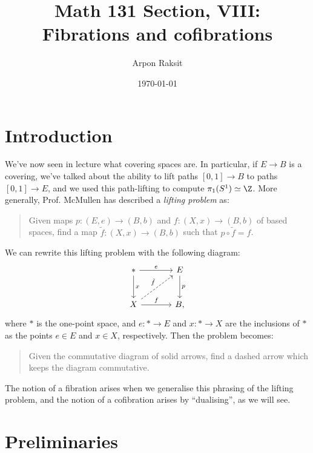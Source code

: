 


\title{Math 131 Section, VIII:\\Fibrations and cofibrations}
\author{Arpon Raksit}
\date{\today}


\maketitle
\thispagestyle{fancy}


\section{Introduction}

We've now seen in lecture what covering spaces are. In particular, if
$E \to B$ is a covering, we've talked about the ability to lift paths
$[0,1] \to B$ to paths $[0,1] \to E$, and we used this path-lifting to
compute $\pi_1(S^1) \simeq \Z$. More generally, Prof. McMullen has
described a \textit{lifting problem} as:
\begin{quote}
  Given maps $p : (E,e) \to (B,b)$ and $f : (X,x) \to (B,b)$ of based
  spaces, find a map $\tilde{f} : (X,x) \to (B,b)$ such that $p \circ
  \tilde{f} = f$.
\end{quote}
We can rewrite this lifting problem with the following diagram:
\[
\begin{tikzcd}[column sep = large, row sep = large]
  * \dar{x} \rar{e} & E \dar{p} \\ X \ar[dashed]{ur}{\tilde{f}}
  \rar{f} & B,
\end{tikzcd}
\]
where $*$ is the one-point space, and $e : * \to E$ and $x : * \to X$
are the inclusions of $*$ as the points $e \in E$ and $x \in X$,
respectively. Then the problem becomes:
\begin{quote}
  Given the commutative diagram of solid arrows, find a dashed arrow
  which keeps the diagram commutative.
\end{quote}
The notion of a fibration arises when we generalise this phrasing of
the lifting problem, and the notion of a cofibration arises by
``dualising'', as we will see.


\section{Preliminaries}

